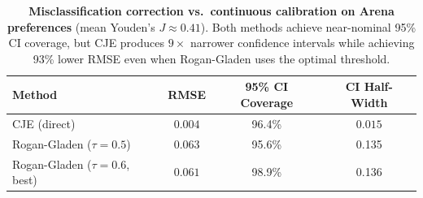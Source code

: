 \begin{table}[t]
\centering
\small
\caption{\textbf{Misclassification correction vs.\ continuous calibration on Arena preferences} (mean Youden's $J \approx 0.41$). Both methods achieve near-nominal 95\% CI coverage, but CJE produces $9\times$ narrower confidence intervals while achieving 93\% lower RMSE even when Rogan-Gladen uses the optimal threshold.}
\label{tab:binary-comparison}
\begin{tabular}{lccc}
\toprule
Method & RMSE & 95\% CI Coverage & CI Half-Width \\
\midrule
CJE (direct) & $\mathbf{0.004}$ & 96.4\% & $\mathbf{0.015}$ \\
Rogan-Gladen ($\tau{=}0.5$) & $0.063$ & 95.6\% & 0.135 \\
Rogan-Gladen ($\tau{=}0.6$, best) & $0.061$ & 98.9\% & 0.136 \\
\bottomrule
\end{tabular}
\vspace{1mm}
\par{}
\end{table}

